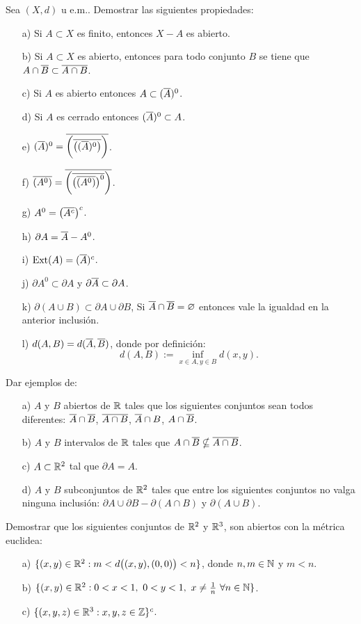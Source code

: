 \begin{ejercicio}{} Sea $(X,d)$ u e.m.. Demostrar las siguientes
propiedades:
\begin{itemize}
	\item[a)] Si $A\subset X$ es finito, entonces $X-A$ es abierto.
	\item[b)] Si $A\subset X$ es abierto, entonces para todo
	conjunto $B$ se tiene que $A\cap \overline{B}\subset \overline{A\cap B}$.
	\item[c)] Si $A$ es abierto entonces $A\subset (\overline{A})^0$.
	\item[d)] Si $A$ es cerrado entonces $(\overline{A})^0\subset A$.
	\item[e)]
	$(\overline{A})^0=\overline{\biggl(\overline{\bigl((\overline{A})^0\bigr)}\biggr)}$.
	\item[f)]
	$\overline{(A^0)}=\overline{\biggl(\overline{\bigl(\overline{(A^0)}\bigr)^0}\biggr)}$.
	\item[g)] $A^0=\bigl(\overline{A^c}\bigr)^c$.
	\item[h)] $\partial A=\overline{A}-A^0$.
	\item[i)] $\text{Ext}(A)=(\overline{A})^c$.
	\item[j)] $\partial A^0\subset \partial A$ y $\partial
	\overline{A}\subset \partial A$.
	\item[k)] $\partial (A\cup B)\subset \partial A\cup\partial
	B$, Si $\overline{A}\cap\overline{B}=\varnothing$ entonces vale la igualdad en
	la anterior inclusión.
	\item[l)] $d(A,B)=d(\overline{A},\overline{B})$, donde por definición:
	\[
		d(A,B):=\inf\limits_{x\in A,y\in B}d(x,y).
	\]
\end{itemize}
\end{ejercicio}
\begin{ejercicio}{} Dar ejemplos de:
\begin{itemize}
\item[a)] $A$ y $B$ abiertos de $\mathbb{R}$ tales que los siguientes
conjuntos sean todos diferentes: $\overline{A}\cap \overline{B}$, $\overline{A\cap B}$,
$\overline{A}\cap B$, $A\cap \overline{B}$.
\item[b)] $A$ y $B$ intervalos de $\mathbb{R}$ tales que
$A\cap\overline{B}\nsubseteq \overline{A\cap B}$.
\item[c)] $A\subset \mathbb{R}^2$ tal que $\partial A=A$.
\item[d)] $A$ y $B$ subconjuntos de $\mathbb{R}^2$ tales que entre los
siguientes conjuntos no valga ninguna inclusión: $\partial
A\cup\partial B-\partial(A\cap B)$ y $\partial (A\cup B)$.
\end{itemize}
\end{ejercicio}
\begin{ejercicio}{} Demostrar que los siguientes conjuntos de
$\mathbb{R}^2$ y $\mathbb{R}^3$, son abiertos con la métrica euclidea:
\begin{itemize}
\item[a)] $\{(x,y)\in\mathbb{R}^2: m<d\bigl((x,y),(0,0)\bigr)<n\}$, donde
$n,m\in\mathbb{N}$ y $m<n$.
\item[b)] $\{(x,y)\in\mathbb{R}^2: 0<x<1,\,\, 0<y<1,\,\,x\neq
\frac1n\,\,\forall n\in\mathbb{N}\}$.
\item[c)] $\{(x,y,z)\in\mathbb{R}^3: x,y,z\in\mathbb{Z}\}^c$.
\end{itemize}
\end{ejercicio}
